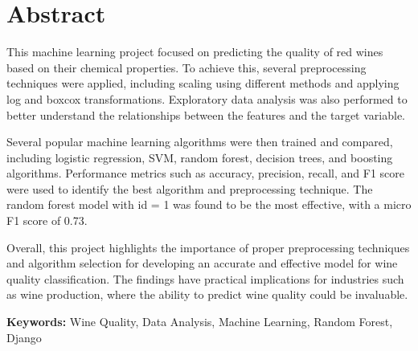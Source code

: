 \chapter{Abstract}
This machine learning project focused on predicting the quality of red wines based on their chemical properties. To achieve this, several preprocessing techniques were applied, including scaling using different methods and applying log and boxcox transformations. Exploratory data analysis was also performed to better understand the relationships between the features and the target variable.

Several popular machine learning algorithms were then trained and compared, including logistic regression, SVM, random forest, decision trees, and boosting algorithms. Performance metrics such as accuracy, precision, recall, and F1 score were used to identify the best algorithm and preprocessing technique. The random forest model with id = 1 was found to be the most effective, with a micro F1 score of 0.73.

Overall, this project highlights the importance of proper preprocessing techniques and algorithm selection for developing an accurate and effective model for wine quality classification. The findings have practical implications for industries such as wine production, where the ability to predict wine quality could be invaluable.

\textbf{Keywords:} Wine Quality, Data Analysis, Machine Learning, Random Forest, Django






